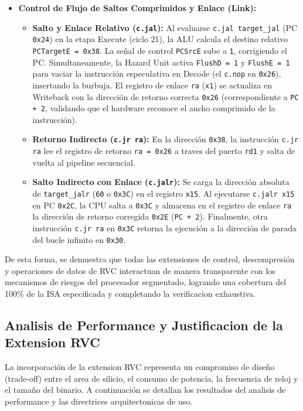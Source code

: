 \documentclass[12pt, a4paper]{article}
\begin{document}
\begin{itemize}
  \item \textbf{Control de Flujo de Saltos Comprimidos y Enlace (Link):}
    \begin{itemize}
      \item \textbf{Salto y Enlace Relativo (\texttt{c.jal}):} Al evaluarse \texttt{c.jal target\_jal} (PC \texttt{0x24}) en la etapa Execute (ciclo 21), la ALU calcula el destino relativo \texttt{PCTargetE = 0x38}. La señal de control \texttt{PCSrcE} sube a \texttt{1}, corrigiendo el PC. Simultaneamente, la Hazard Unit activa \texttt{FlushD = 1} y \texttt{FlushE = 1} para vaciar la instrucción especulativa en Decode (el \texttt{c.nop} en \texttt{0x26}), insertando la burbuja. El registro de enlace \texttt{ra} (\texttt{x1}) se actualiza en Writeback con la dirección de retorno correcta \texttt{0x26} (correspondiente a \texttt{PC + 2}, validando que el hardware reconoce el ancho comprimido de la instrucción).
      \item \textbf{Retorno Indirecto (\texttt{c.jr ra}):} En la dirección \texttt{0x38}, la instrucción \texttt{c.jr ra} lee el registro de retorno \texttt{ra = 0x26} a traves del puerto \texttt{rd1} y salta de vuelta al pipeline secuencial.
      \item \textbf{Salto Indirecto con Enlace (\texttt{c.jalr}):} Se carga la dirección absoluta de \texttt{target\_jalr} (\texttt{60} o \texttt{0x3C}) en el registro \texttt{x15}. Al ejecutarse \texttt{c.jalr x15} en PC \texttt{0x2C}, la CPU salta a \texttt{0x3C} y almacena en el registro de enlace \texttt{ra} la dirección de retorno corregida \texttt{0x2E} (\texttt{PC + 2}). Finalmente, otra instrucción \texttt{c.jr ra} en \texttt{0x3C} retorna la ejecución a la dirección de parada del bucle infinito en \texttt{0x30}.
    \end{itemize}
\end{itemize}
De esta forma, se demuestra que todas las extensiones de control, descompresión y operaciones de datos de RVC interactuan de manera transparente con los mecanismos de riesgos del procesador segmentado, logrando una cobertura del 100\% de la ISA especificada y completando la verificacion exhaustiva.

\subsection{Analisis de Performance y Justificacion de la Extension RVC}
La incorporación de la extension RVC representa un compromiso de diseño (trade-off) entre el area de silicio, el consumo de potencia, la frecuencia de reloj y el tamaño del binario. A continuación se detallan los resultados del analisis de performance y las directrices arquitectonicas de uso.
\end{document}
